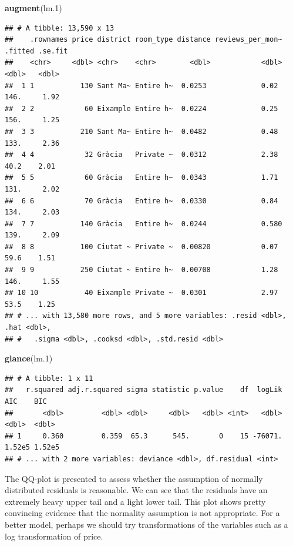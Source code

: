 \documentclass[]{article}
\newenvironment{Shaded}{\begin{snugshade}}{\end{snugshade}}
\newcommand{\FloatTok}[1]{\textcolor[rgb]{0.00,0.00,0.81}{#1}}
\newcommand{\KeywordTok}[1]{\textcolor[rgb]{0.13,0.29,0.53}{\textbf{#1}}}
\newcommand{\NormalTok}[1]{#1}
\begin{document}
\begin{Shaded}
\begin{Highlighting}[]
\KeywordTok{augment}\NormalTok{(lm}\FloatTok{.1}\NormalTok{)}
\end{Highlighting}
\end{Shaded}

\begin{verbatim}
## # A tibble: 13,590 x 13
##    .rownames price district room_type distance reviews_per_mon~ .fitted .se.fit
##    <chr>     <dbl> <chr>    <chr>        <dbl>            <dbl>   <dbl>   <dbl>
##  1 1           130 Sant Ma~ Entire h~  0.0253             0.02    146.     1.92
##  2 2            60 Eixample Entire h~  0.0224             0.25    156.     1.25
##  3 3           210 Sant Ma~ Entire h~  0.0482             0.48    133.     2.36
##  4 4            32 Gràcia   Private ~  0.0312             2.38     40.2    2.01
##  5 5            60 Gràcia   Entire h~  0.0343             1.71    131.     2.02
##  6 6            70 Gràcia   Entire h~  0.0330             0.84    134.     2.03
##  7 7           140 Gràcia   Entire h~  0.0244             0.580   139.     2.09
##  8 8           100 Ciutat ~ Private ~  0.00820            0.07     59.6    1.51
##  9 9           250 Ciutat ~ Entire h~  0.00708            1.28    146.     1.55
## 10 10           40 Eixample Private ~  0.0301             2.97     53.5    1.25
## # ... with 13,580 more rows, and 5 more variables: .resid <dbl>, .hat <dbl>,
## #   .sigma <dbl>, .cooksd <dbl>, .std.resid <dbl>
\end{verbatim}

\begin{Shaded}
\begin{Highlighting}[]
\KeywordTok{glance}\NormalTok{(lm}\FloatTok{.1}\NormalTok{)}
\end{Highlighting}
\end{Shaded}

\begin{verbatim}
## # A tibble: 1 x 11
##   r.squared adj.r.squared sigma statistic p.value    df  logLik    AIC    BIC
##       <dbl>         <dbl> <dbl>     <dbl>   <dbl> <int>   <dbl>  <dbl>  <dbl>
## 1     0.360         0.359  65.3      545.       0    15 -76071. 1.52e5 1.52e5
## # ... with 2 more variables: deviance <dbl>, df.residual <int>
\end{verbatim}

The QQ-plot is presented to assess whether the assumption of normally
distributed residuals is reasonable. We can see that the residuals have
an extremely heavy upper tail and a light lower tail. This plot shows
pretty convincing evidence that the normality assumption is not
appropriate. For a better model, perhaps we should try transformations
of the variables such as a log transformation of price.
\end{document}

